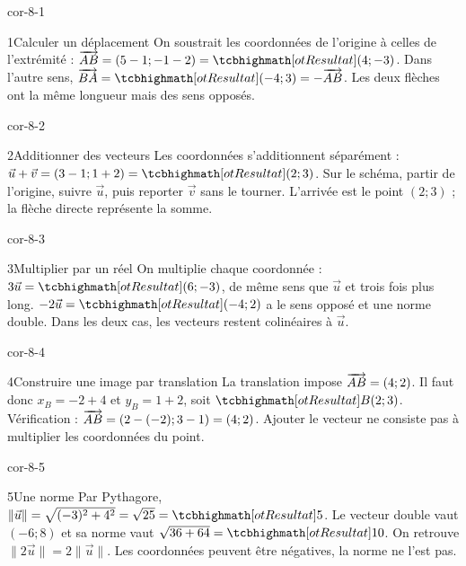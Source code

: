 \clearpage\pagestyle{otMain}\fontsize{11}{15}\selectfont
{}
\begin{blocLivre}{cor-8-1}
\begin{corrige}{1}{Calculer un déplacement}
On soustrait les coordonnées de l’origine à celles de l’extrémité : $\vect{AB}=(5-1;-1-2)=\res{(4;-3)}$. Dans l’autre sens, $\vect{BA}=\res{(-4;3)}=-\vect{AB}$. Les deux flèches ont la même longueur mais des sens opposés.
\label{fig-cor-8-1}
\end{corrige}
\end{blocLivre}
\begin{blocLivre}{cor-8-2}
\begin{corrige}{2}{Additionner des vecteurs}
Les coordonnées s’additionnent séparément : $\vec u+\vec v=(3-1;1+2)=\res{(2;3)}$. Sur le schéma, partir de l’origine, suivre $\vec u$, puis reporter $\vec v$ sans le tourner. L’arrivée est le point $(2;3)$ ; la flèche directe représente la somme.
\label{fig-cor-8-2}
\end{corrige}
\end{blocLivre}
\begin{blocLivre}{cor-8-3}
\begin{corrige}{3}{Multiplier par un réel}
On multiplie chaque coordonnée : $3\vec u=\res{(6;-3)}$, de même sens que $\vec u$ et trois fois plus long. $-2\vec u=\res{(-4;2)}$ a le sens opposé et une norme double. Dans les deux cas, les vecteurs restent colinéaires à $\vec u$.
\label{fig-cor-8-3}
\end{corrige}
\end{blocLivre}
\begin{blocLivre}{cor-8-4}
\begin{corrige}{4}{Construire une image par translation}
La translation impose $\overrightarrow{AB}=(4;2)$. Il faut donc $x_B=-2+4$ et $y_B=1+2$, soit $\res{B(2;3)}$. Vérification : $\overrightarrow{AB}=(2-(-2);3-1)=(4;2)$. Ajouter le vecteur ne consiste pas à multiplier les coordonnées du point.
\label{fig-cor-8-4}
\end{corrige}
\end{blocLivre}
\begin{blocLivre}{cor-8-5}
\begin{corrige}{5}{Une norme}
Par Pythagore, $\|\vec u\|=\sqrt{(-3)^2+4^2}=\sqrt{25}=\res5$. Le vecteur double vaut $(-6;8)$ et sa norme vaut $\sqrt{36+64}=\res{10}$. On retrouve $\|2\vec u\|=2\|\vec u\|$. Les coordonnées peuvent être négatives, la norme ne l’est pas.
\label{fig-cor-8-5}
\end{corrige}
\end{blocLivre}
